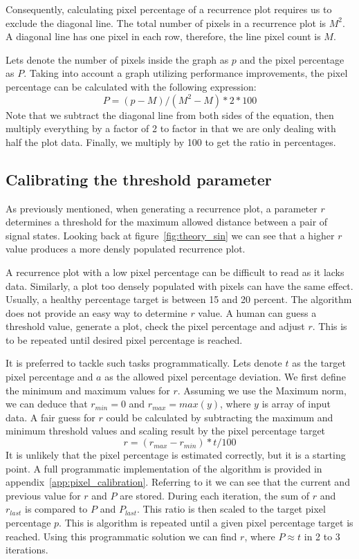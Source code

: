 \documentclass[a4paper,12pt,fleqn]{article}
\begin{document}
Consequently, calculating pixel percentage of a recurrence plot requires us to exclude the diagonal line.
The total number of pixels in a recurrence plot is $M^2$.
A diagonal line has one pixel in each row, therefore, the line pixel count is $M$.

Lets denote the number of pixels inside the graph as $p$ and the pixel percentage as $P$.
Taking into account a graph utilizing performance improvements, the pixel percentage can be calculated with the following expression:
\[
  P = (p-M)/(M^2-M)*2*100
\]
Note that we subtract the diagonal line from both sides of the equation, then multiply everything by a factor of 2 to factor in that we are only dealing with half the plot data.
Finally, we multiply by 100 to get the ratio in percentages.


\subsection{Calibrating the threshold parameter}
\label{sec:calibrating-threshold}
As previously mentioned, when generating a recurrence plot, a parameter $r$ determines a threshold for the maximum allowed distance between a pair of signal states.
Looking back at figure~\ref{fig:theory_sin} we can see that a higher $r$ value produces a more densly populated recurrence plot.

A recurrence plot with a low pixel percentage can be difficult to read as it lacks data.
Similarly, a plot too densely populated with pixels can have the same effect.
Usually, a healthy percentage target is between 15 and 20 percent.
The algorithm does not provide an easy way to determine $r$ value.
A human can guess a threshold value, generate a plot, check the pixel percentage and adjust $r$.
This is to be repeated until desired pixel percentage is reached.

It is preferred to tackle such tasks programmatically.
Lets denote $t$ as the target pixel percentage and $a$ as the allowed pixel percentage deviation.
We first define the minimum and maximum values for $r$.
Assuming we use the Maximum norm, we can deduce that $r_{min}=0$ and $r_{max}=max(y)$, where $y$ is array of input data.
A fair guess for $r$ could be calculated by subtracting the maximum and minimum threshold values and scaling result by the pixel percentage target
\[r=(r_{max}-r_{min})*t/100\]
It is unlikely that the pixel percentage is estimated correctly, but it is a starting point.
A full programmatic implementation of the algorithm is provided in appendix~\ref{app:pixel_calibration}.
Referring to it we can see that the current and previous value for $r$ and $P$ are stored.
During each iteration, the sum of $r$ and $r_{last}$ is compared to $P$ and $P_{last}$.
This ratio is then scaled to the target pixel percentage $p$.
This is algorithm is repeated until a given pixel percentage target is reached.
Using this programmatic solution we can find $r$, where $P≈t$ in 2 to 3 iterations.
\end{document}
